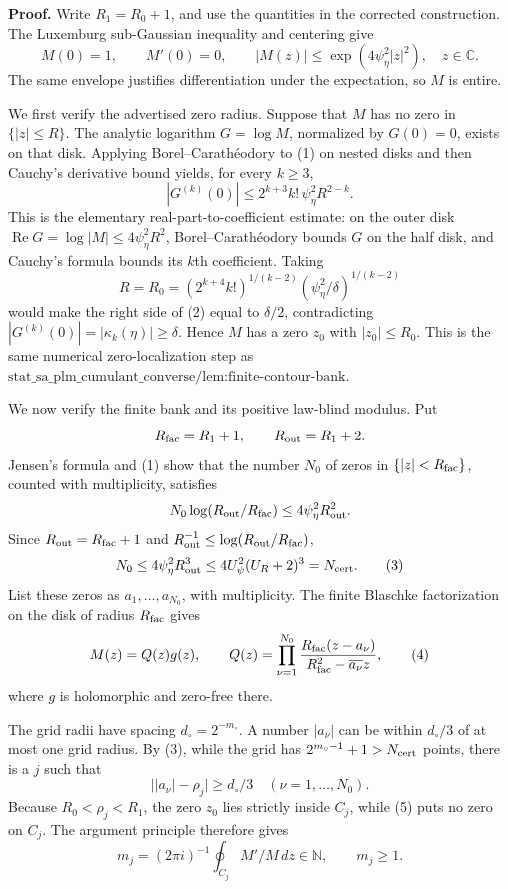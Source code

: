 \textbf{Proof.}
Write \(R_1=R_0+1\), and use the quantities in the corrected construction.  The Luxemburg sub-Gaussian inequality and centering give
\[
 M(0)=1,\qquad M'(0)=0,\qquad
 |M(z)|\le \exp(4\psi_\eta^2|z|^2),\quad z\in\mathbb C. \tag{1}
\]
The same envelope justifies differentiation under the expectation, so \(M\) is entire.

We first verify the advertised zero radius.  Suppose that \(M\) has no zero in \(\{|z|\le R\}\).  The analytic logarithm \(G=\log M\), normalized by \(G(0)=0\), exists on that disk.  Applying Borel--Carathéodory to (1) on nested disks and then Cauchy's derivative bound yields, for every \(k\ge3\),
\[
 |G^{(k)}(0)|\le 2^{k+3}k!\,\psi_\eta^2R^{2-k}. \tag{2}
\]
This is the elementary real-part-to-coefficient estimate: on the outer disk \(\operatorname{Re}G=\log|M|\le4\psi_\eta^2R^2\), Borel--Carathéodory bounds \(G\) on the half disk, and Cauchy's formula bounds its \(k\)th coefficient.  Taking
\[
 R=R_0=(2^{k+4}k!)^{1/(k-2)}
       (\psi_\eta^2/\delta)^{1/(k-2)}
\]
would make the right side of (2) equal to \(\delta/2\), contradicting
\(|G^{(k)}(0)|=|\kappa_k(\eta)|\ge\delta\).  Hence \(M\) has a zero \(z_0\) with \(|z_0|\le R_0\).  This is the same numerical zero-localization step as
\(\text{stat\_sa\_plm\_cumulant\_converse/lem:finite-contour-bank}\).

We now verify the finite bank and its positive law-blind modulus.  Put
\[
 R_{\rm fac}=R_1+1,\qquad R_{\rm out}=R_1+2.
\]
Jensen's formula and (1) show that the number \(N_0\) of zeros in
\(\{|z|<R_{\rm fac}\}\), counted with multiplicity, satisfies
\[
 N_0\log(R_{\rm out}/R_{\rm fac})
 \le4\psi_\eta^2R_{\rm out}^2.
\]
Since \(R_{\rm out}=R_{\rm fac}+1\) and
\(R_{\rm out}^{-1}\le\log(R_{\rm out}/R_{\rm fac})\),
\[
 N_0\le4\psi_\eta^2R_{\rm out}^3
 \le4U_\psi^2(U_R+2)^3=N_{\rm cert}. \tag{3}
\]
List these zeros as \(a_1,\ldots,a_{N_0}\), with multiplicity.  The finite Blaschke factorization on the disk of radius \(R_{\rm fac}\) gives
\[
 M(z)=Q(z)g(z),\qquad
 Q(z)=\prod_{\nu=1}^{N_0}
 \frac{R_{\rm fac}(z-a_\nu)}
 {R_{\rm fac}^2-\overline{a_\nu}z}, \tag{4}
\]
where \(g\) is holomorphic and zero-free there.

The grid radii have spacing \(d_\circ=2^{-m_\circ}\).  A number \(|a_\nu|\) can be within \(d_\circ/3\) of at most one grid radius.  By (3), while the grid has
\(2^{m_\circ-1}+1>N_{\rm cert}\) points, there is a \(j\) such that
\[
 \bigl||a_\nu|-\rho_j\bigr|\ge d_\circ/3
 \quad(\nu=1,\ldots,N_0). \tag{5}
\]
Because \(R_0<\rho_j<R_1\), the zero \(z_0\) lies strictly inside \(C_j\), while (5) puts no zero on \(C_j\).  The argument principle therefore gives
\[
 m_j=(2\pi i)^{-1}\oint_{C_j}M'/M\,dz\in\mathbb N,\qquad m_j\ge1. \tag{6}
\]

